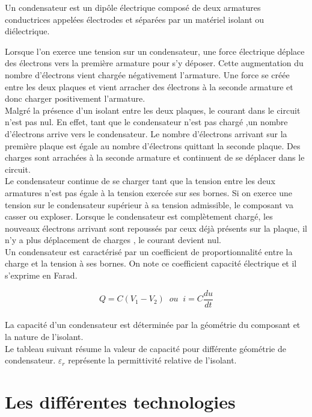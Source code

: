 Un condensateur est un dipôle électrique composé de deux armatures conductrices appelées électrodes et séparées par un matériel isolant ou diélectrique.


Lorsque l'on exerce une tension sur un condensateur, une force électrique déplace des électrons vers la première armature pour s'y déposer. Cette augmentation du nombre d'électrons vient chargée négativement l'armature. Une force se créée entre les deux plaques et vient arracher des électrons à la seconde armature et donc charger positivement l'armature. \\ 

Malgré la présence d'un isolant entre les deux plaques, le courant dans le circuit n'est pas nul. En effet, tant que le condensateur n'est pas chargé ,un nombre d'électrons arrive vers le condensateur. Le nombre d'électrons arrivant sur la première plaque est égale au nombre d'électrons quittant la seconde plaque. Des charges sont arrachées à la seconde armature et continuent de se déplacer dans le circuit.  \\ 

Le condensateur continue de se charger tant que la tension entre les deux armatures n'est pas égale à la tension exercée sur ses bornes. Si on exerce une tension sur le condensateur supérieur à sa tension admissible, le composant va casser ou exploser. Lorsque le condensateur est complètement chargé, les nouveaux électrons arrivant sont repoussés par ceux déjà présents sur la plaque, il n'y a plus déplacement de charges , le courant devient nul. \\

Un condensateur est caractérisé par un coefficient de proportionnalité entre la charge et la tension à ses bornes. On note ce coefficient capacité électrique et il s'exprime en Farad.

$$ Q = C(V_1 - V_2) \;\; ou \;\; i = C \frac{du}{dt}$$ \\

La capacité d'un condensateur est déterminée par la géométrie du composant et la nature de l'isolant. \\

Le tableau suivant résume la valeur de capacité pour différente géométrie de condensateur. $ \varepsilon_r $ représente la permittivité relative de l'isolant.\\


\chapter{Les différentes technologies}

